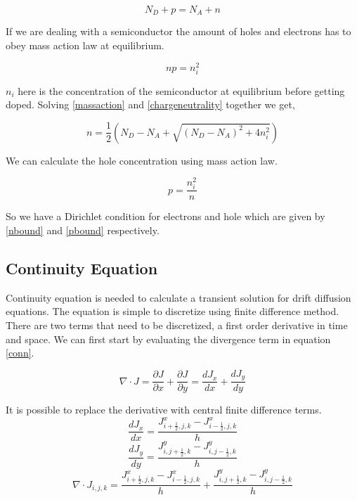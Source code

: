 \begin{equation}
N_{D} + p=N_{A} + n
\label{chargeneutrality}
\end{equation}

If we are dealing with a semiconductor the amount of holes and electrons has to obey mass action law at equilibrium.

\begin{equation}
np=n_i^2
\label{massaction}
\end{equation}

$n_i$ here is the concentration of the semiconductor at equilibrium before getting doped. Solving \eqref{massaction} and \eqref{chargeneutrality} together we get,

\begin{equation}
n=\frac{1}{2}(N_D - N_A + \sqrt{(N_D - N_A)^2+4n_i^2})
\label{nbound}
\end{equation}

We can calculate the hole concentration using mass action law.

\begin{equation}
p=\frac{n_i^2}{n}
\label{pbound}
\end{equation}

So we have a Dirichlet condition for electrons and hole which are given by \ref{nbound} and \ref{pbound} respectively.

\clearpage
\subsection{Continuity Equation}
Continuity equation is needed to calculate a transient solution for drift diffusion equations. The equation is simple to discretize using finite difference method. There are two terms that need to be discretized, a first order derivative in time and space. We can first start by evaluating the divergence term in equation \eqref{conn}.

\begin{equation}
\nabla \cdot J=\frac{\partial J}{\partial x}+\frac{\partial J}{\partial y}=\frac{d J_x}{d x}+\frac{d J_y}{d y}
\end{equation}

It is possible to replace the derivative with central finite difference terms.
\begin{equation}
\frac{d J_x}{d x}=\frac{J^x_{i+\frac{1}{2},j,k}-J^x_{i-\frac{1}{2},j,k}}{h}
\end{equation}
\begin{equation}
\frac{d J_y}{d y}=\frac{J^y_{i,j+\frac{1}{2},k}-J^y_{i,j-\frac{1}{2},k}}{h}
\end{equation}
\begin{equation}
\nabla \cdot J_{i,j,k}=\frac{J^x_{i+\frac{1}{2},j,k}-J^x_{i-\frac{1}{2},j,k}}{h}+\frac{J^y_{i,j+\frac{1}{2},k}-J^y_{i,j-\frac{1}{2},k}}{h}
\end{equation}

